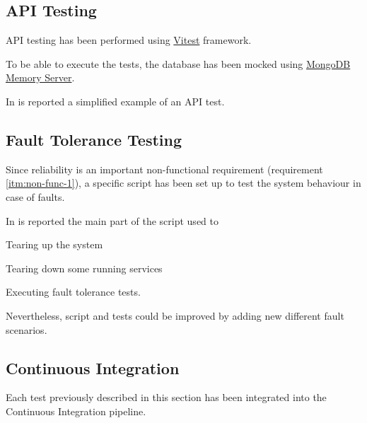 \documentclass{scrartcl}
\begin{document}
    \subsection{API Testing}\label{subsec:api-testing}

    API testing has been performed using \href{https://vitest.dev/}{Vitest} framework.

    To be able to execute the tests, the database has been mocked using \href{https://github.com/nodkz/mongodb-memory-server}{MongoDB Memory Server}.

    In  is reported a simplified example of an API test.

    


    \subsection{Fault Tolerance Testing}\label{subsec:fault-tolerance-testing}

    Since reliability is an important non-functional requirement (requirement \ref{itm:non-func-1}),
    a specific script has been set up to test the system behaviour in case of faults.

    In  is reported the main part of the script used to
    \begin{enumerate*}
        \item Tearing up the system
        \item Tearing down some running services
        \item Executing fault tolerance tests.
    \end{enumerate*}

    Nevertheless, script and tests could be improved by adding new different fault scenarios.

    

    \subsection{Continuous Integration}\label{subsec:continuous-integration}

    Each test previously described in this section has been integrated into the Continuous Integration pipeline.
\end{document}
